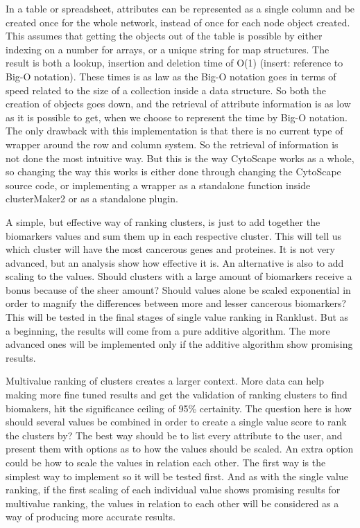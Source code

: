 \documentclass[UKenglish]{ifimaster}
\begin{document}
In a table or spreadsheet, attributes can be represented as a single column and be created once for the whole network,
instead of once for each node object created. This assumes that getting the objects out of the table is possible by
either indexing on a number for arrays, or a unique string for map structures. The result is both a lookup, insertion
and deletion time of O(1) (insert: reference to Big-O notation).  These times is as law as the Big-O notation goes in
terms of speed related to the size of a collection inside a data structure. So both the creation of objects goes down,
and the retrieval of attribute information is as low as it is possible to get, when we choose to represent the time by
Big-O notation. The only drawback with this implementation is that there is no current type of wrapper around the row
and column system. So the retrieval of information is not done the most intuitive way. But this is the way CytoScape
works as a whole, so changing the way this works is either done through changing the CytoScape source code, or
implementing a wrapper as a standalone function inside clusterMaker2 or as a standalone plugin.

A simple, but effective way of ranking clusters, is just to add together the biomarkers values and sum them up in each
respective cluster. This will tell us which cluster will have the most cancerous genes and proteines. It is not very
advanced, but an analysis show how effective it is. An alternative is also to add scaling to the values. Should clusters
with a large amount of biomarkers receive a bonus because of the sheer amount? Should values alone be scaled exponential
in order to magnify the differences between more and lesser cancerous biomarkers? This will be tested in the final
stages of single value ranking in Ranklust. But as a beginning, the results will come from a pure additive algorithm.
The more advanced ones will be implemented only if the additive algorithm show promising results.

Multivalue ranking of clusters creates a larger context. More data can help making more fine tuned results and get the
validation of ranking clusters to find biomakers, hit the significance ceiling of 95\% certainity. %
The question here is how should several values be combined in order to create a single value score to rank the clusters
by? The best way should be to list every attribute to the user, and present them with options as to how the values
should be scaled. An extra option could be how to scale the values in relation each other. The first way is the simplest
way to implement so it will be tested first. And as with the single value ranking, if the first scaling of each
individual value shows promising results for multivalue ranking, the values in relation to each other will be
considered as a way of producing more accurate results.
\end{document}
